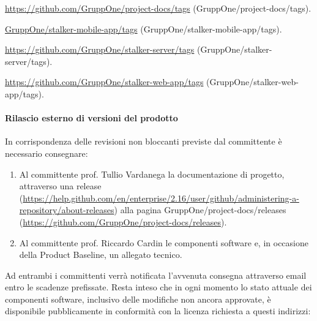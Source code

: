 \documentclass[../../norme-di-progetto.tex]{subfiles}
\begin{document}
\begin{description}
  \item \href{https://github.com/GruppOne/project-docs/tags}{https://github.com/GruppOne/project-docs/tags} (GruppOne/project-docs/tags).
  \item \href{https://github.com/GruppOne/stalker-mobile-app/tags}{GruppOne/stalker-mobile-app/tags} (GruppOne/stalker-mobile-app/tags).
  \item \href{https://github.com/GruppOne/stalker-server/tags}{https://github.com/GruppOne/stalker-server/tags} (GruppOne/stalker-server/tags).
  \item \href{https://github.com/GruppOne/stalker-web-app/tags}{https://github.com/GruppOne/stalker-web-app/tags} (GruppOne/stalker-web-app/tags).
\end{description}


\paragraph{Rilascio esterno di versioni del prodotto}%
\label{par:rilascio_esterno_di_versioni_del_prodotto}

In corrispondenza delle revisioni non bloccanti previste dal committente è necessario consegnare:

\begin{enumerate}
  \item Al committente prof. Tullio Vardanega la documentazione di progetto, attraverso una release (\href{https://help.github.com/en/enterprise/2.16/user/github/administering-a-repository/about-releases}{https://help.github.com/en/enterprise/2.16/user/github/administering-a-repository/about-releases}) alla pagina GruppOne/project-docs/releases (\href{https://github.com/GruppOne/project-docs/releases}{https://github.com/GruppOne/project-docs/releases}).
  \item Al committente prof. Riccardo Cardin le componenti software e, in occasione della Product Baseline, un allegato tecnico.
\end{enumerate}

Ad entrambi i committenti verrà notificata l'avvenuta consegna attraverso email entro le scadenze prefissate.
Resta inteso che in ogni momento lo stato attuale dei componenti software, inclusivo delle modifiche non ancora approvate, è disponibile pubblicamente in conformità con la licenza richiesta a questi indirizzi:
\end{document}

